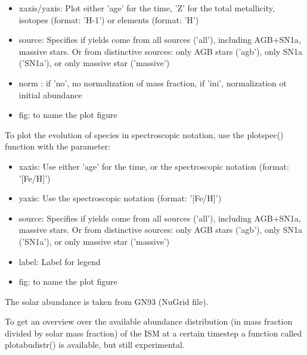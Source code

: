 {\begin{itemize}
  \item xaxis/yaxis: Plot either 'age' for the time, 'Z' for the
	total metallicity, isotopes (format: 'H-1') or elements (format: 'H')
   \item source: Specifies if yields come from
            all sources ('all'), including
          AGB+SN1a, massive stars. Or from
          distinctive sources:
         only AGB stars ('agb'), only
          SN1a ('SN1a'), or only massive star ('massive')	
	\item norm : if 'no', no normalization of mass fraction,
                 if 'ini', normalization ot initial abundance

	
	
  \item fig: to name the plot figure
\end{itemize}

To plot the evolution of species in spectroscopic notation,
use the plot\textunderscore spec() function with the parameter:

\begin{itemize}
  \item xaxis: Use either 'age' for the time, or the
				spectroscopic notation (format: '[Fe/H]')
  \item yaxis: Use the spectroscopic notation (format: '[Fe/H]')
  
   \item source: Specifies if yields come from
            all sources ('all'), including
          AGB+SN1a, massive stars. Or from
          distinctive sources:
         only AGB stars ('agb'), only
          SN1a ('SN1a'), or only massive star ('massive')

  	\item label: Label for legend
  \item fig: to name the plot figure
\end{itemize}

The solar abundance is taken from GN93 (NuGrid file).

To get an overview over the available abundance distribution
(in mass fraction divided by solar mass fraction) of the ISM at a certain timestep a function
called plot\textunderscore abu\textunderscore distr() is available,
but still experimental.

\begin{itemize} 


\end{itemize}}
